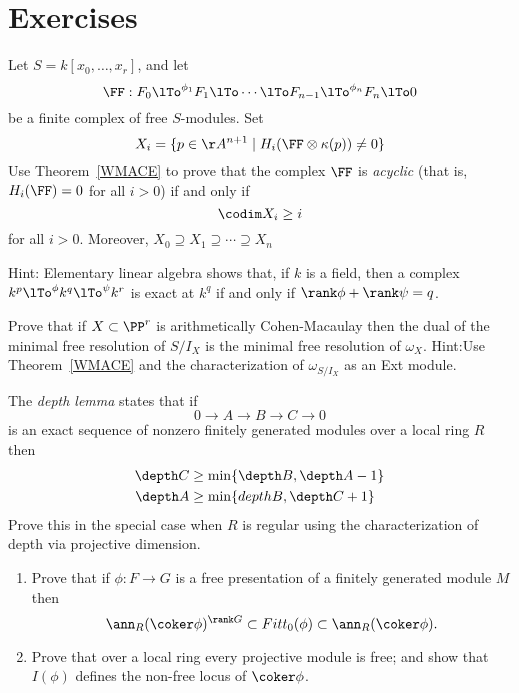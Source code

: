 \section{Exercises}

\begin{exercise}\label{WMACE corollary}
 Let $S = k[x_0,\dots, x_r]$, and let
 $$ 
\FF:  F_0\lTo^{\phi_1}F_1 \lTo \cdots \lTo F_{n-1}\lTo^{\phi_n} F_n\lTo 0
 $$
be a finite complex of free $S$-modules. Set
$$
X_i = \{p\in \AA^{n+1} \mid  H_i(\FF \otimes \kappa(p)) \neq 0\}
$$
Use Theorem~\ref{WMACE} to prove that the complex $\FF$ is \emph{acyclic} (that is, $H_i(\FF) = 0$ for all $i>0$) if and only if
$$
\codim X_i \geq i
$$
for all $i>0$. Moreover, $X_{0}\supseteq X_{1}\supseteq \cdots \supseteq X_{n}$

Hint: Elementary linear algebra shows that, if $k$ is a field, then a complex $k^p \lTo^{\phi} k^q \lTo^\psi k^r$ is exact at $k^q$ if and
only if $\rank \phi +\rank \psi = q$. 
\end{exercise}

\begin{exercise}
Prove that if $X\subset \PP^r$ is arithmetically Cohen-Macaulay then the dual of the minimal free resolution of $S/I_X$
is the minimal free resolution of $\omega_X$. Hint:Use Theorem~\ref{WMACE} and the characterization of $\omega_{S/I_X}$
as an Ext module.
\end{exercise}

\begin{exercise}
The \emph{depth lemma} states that if 
$$
0\to A\to B\to C \to 0
$$
is an exact sequence of nonzero finitely generated modules over a local ring $R$ then
$$
\begin{aligned}
 \depth C &\geq \min\{\depth B, \depth A-1\}\\
 \depth A & \geq \min\{depth B, \depth C +1\}
 \end{aligned}
 $$
Prove this in the special case when $R$ is regular using the characterization of depth
 via projective dimension.
\end{exercise}

\begin{exercise}
\begin{enumerate}
 \item Prove that if $\phi: F\to G$ is a free presentation of a finitely generated module $M$
then 
$$
\ann_{R}(\coker \phi)^{\rank G}\subset Fitt_{0}(\phi) \subset \ann_{R}(\coker \phi).
$$
\item Prove that over a local ring every projective module is free; and show that 
$I(\phi)$ defines the non-free locus of $\coker \phi$. 
\end{enumerate}
\end{exercise}

